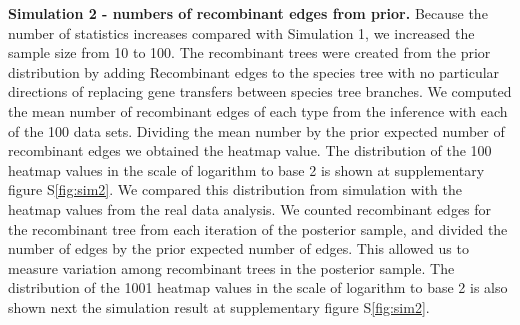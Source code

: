 \documentclass[12pt]{article}
\begin{document}

\textbf{Simulation 2 - numbers of recombinant edges from prior.}
Because the number of statistics increases compared with Simulation 1, we
increased the sample size from 10 to 100.  The recombinant trees were created
from the prior distribution by adding Recombinant edges to the species tree with
no particular directions of replacing gene transfers between species tree
branches.  We computed the mean number of recombinant edges of each type from
the inference with each of the 100 data sets. Dividing the mean number by the
prior expected number of recombinant edges we obtained the heatmap value.  The
distribution of the 100 heatmap values in the scale of logarithm to base 2 is
shown at supplementary figure S\ref{fig:sim2}.  
We compared this distribution from simulation
with the heatmap values from the real data analysis.  We counted recombinant
edges for the recombinant tree from each iteration of the posterior sample, and
divided the number of edges by the prior expected number of edges. This allowed
us to measure variation among recombinant trees in the posterior sample.  The
distribution of the 1001 heatmap values in the scale of logarithm to base 2 is
also shown next the simulation result at supplementary figure S\ref{fig:sim2}.
\end{document}
